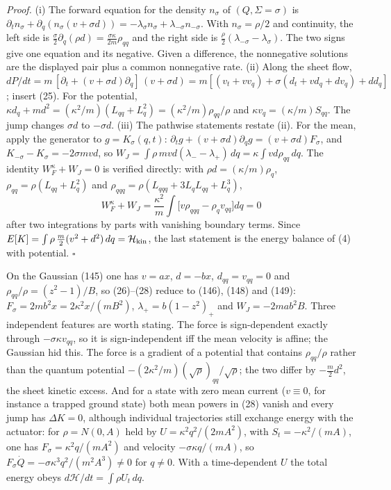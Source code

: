 \documentclass[11pt,a4paper]{article}
\begin{document}
\emph{Proof.} (i) The forward equation for the density \(n_\sigma\) of
\((Q,\Sigma=\sigma)\) is
\(\partial_tn_\sigma+\partial_q(n_\sigma(v+\sigma d)) =-\lambda_\sigma n_\sigma+\lambda_{-\sigma}n_{-\sigma}\).
With \(n_\sigma=\rho/2\) and continuity, the left side is
\(\tfrac\sigma2\partial_q(\rho d)=\tfrac{\sigma\kappa}{2m}\rho_{qq}\)
and the right side is \(\tfrac\rho2(\lambda_{-\sigma}-\lambda_\sigma)\).
The two signs give one equation and its negative. Given a difference,
the nonnegative solutions are the displayed pair plus a common
nonnegative rate. (ii) Along the sheet flow,
\(dP/dt=m\,[\partial_t+(v+\sigma d)\partial_q]\,(v+\sigma d) =m[(v_t+vv_q)+\sigma(d_t+vd_q+dv_q)+dd_q]\);
insert (25). For the potential,
\(\kappa d_q+md^2=(\kappa^2/m)(L_{qq}+L_q^2) =(\kappa^2/m)\rho_{qq}/\rho\)
and \(\kappa v_q=(\kappa/m)S_{qq}\). The jump changes \(\sigma d\) to
\(-\sigma d\). (iii) The pathwise statements restate (ii). For the mean,
apply the generator to \(g=K_\sigma(q,t)\):
\(\partial_tg+(v+\sigma d)\partial_qg =(v+\sigma d)F_\sigma\), and
\(K_{-\sigma}-K_\sigma=-2\sigma mvd\), so
\(W_J=\int\rho\,mvd(\lambda_--\lambda_+)\,dq=\kappa\int vd\rho_{qq}\,dq\).
The identity \(W_F^\kappa+W_J=0\) is verified directly: with
\(\rho d=(\kappa/m)\rho_q\), \(\rho_{qq}=\rho(L_{qq}+L_q^2)\) and
\(\rho_{qqq}=\rho(L_{qqq}+3L_qL_{qq}+L_q^3)\),
\[W_F^\kappa+W_J=\frac{\kappa^2}{m}\int\big[
 v\rho_{qqq}-\rho_qv_{qq}\big]dq=0\] after two integrations by parts
with vanishing boundary terms. Since
\(E[K]=\int\rho\,\tfrac m2(v^2+d^2)\,dq=\mathcal H_{\rm kin}\), the last
statement is the energy balance of (4) with potential. \(\square\)

On the Gaussian (145) one has \(v=ax\), \(d=-bx\), \(d_{qq}=v_{qq}=0\)
and \(\rho_{qq}/\rho=(z^2-1)/B\), so (26)--(28) reduce to (146), (148)
and (149): \(F_\sigma=2mb^2x=2\kappa^2x/(mB^2)\),
\(\lambda_+=b(1-z^2)_+\) and \(W_J=-2mab^2B\). Three independent
features are worth stating. The force is sign-dependent exactly through
\(-\sigma\kappa v_{qq}\), so it is sign-independent iff the mean
velocity is affine; the Gaussian hid this. The force is a gradient of a
potential that contains \(\rho_{qq}/\rho\) rather than the quantum
potential \(-(2\kappa^2/m)(\sqrt\rho)_{qq}/\sqrt\rho\); the two differ
by \(-\tfrac m2d^2\), the sheet kinetic excess. And for a state with
zero mean current (\(v\equiv0\), for instance a trapped ground state)
both mean powers in (28) vanish and every jump has \(\Delta K=0\),
although individual trajectories still exchange energy with the
actuator: for \(\rho=N(0,A)\) held by \(U=\kappa^2q^2/(2mA^2)\), with
\(S_t=-\kappa^2/(mA)\), one has \(F_\sigma=\kappa^2q/(mA^2)\) and
velocity \(-\sigma\kappa q/(mA)\), so
\(F_\sigma\dot Q=-\sigma\kappa^3q^2/(m^2A^3)\neq0\) for \(q\neq0\). With
a time-dependent \(U\) the total energy obeys
\(d\mathcal H/dt=\int\rho U_t\,dq\).
\end{document}
